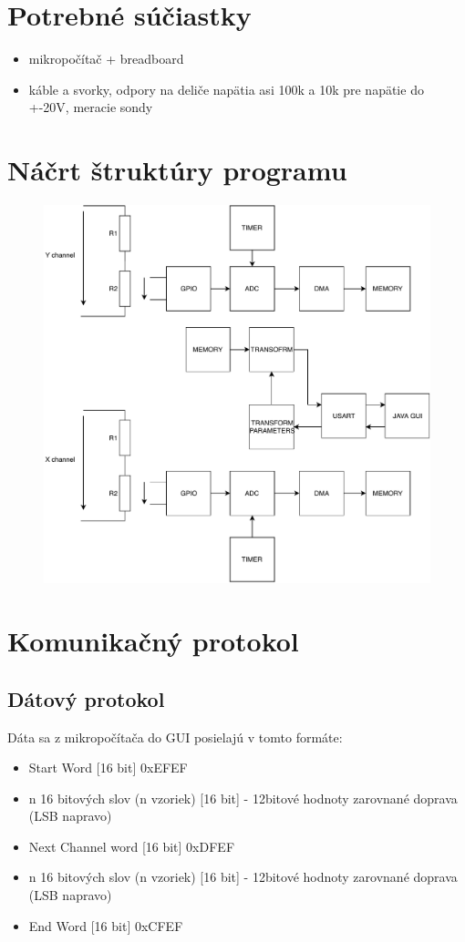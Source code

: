 \documentclass{article}
\begin{document}
	\section{Potrebné súčiastky}
		\begin{itemize}
		\item mikropočítač + breadboard
		\item káble a svorky, odpory na deliče napätia asi 100k a 10k pre napätie do +-20V, meracie sondy
	\end{itemize}
	\section{Náčrt štruktúry programu}
	
	\begin{figure}[h!]
		\centering
		\includegraphics[width=\linewidth]{../Obrazky/basicstructure.pdf}
	\end{figure}


	\pagebreak
	\section{Komunikačný protokol}
	\subsection{Dátový protokol}
	Dáta sa z mikropočítača do GUI posielajú v tomto formáte:
		\begin{itemize}
			\item Start Word [16 bit]	0xEFEF
			\item n 16 bitových slov (n vzoriek) [16 bit] - 12bitové hodnoty zarovnané doprava (LSB napravo)
			\item Next Channel word [16 bit] 0xDFEF
			\item n 16 bitových slov (n vzoriek) [16 bit] - 12bitové hodnoty zarovnané doprava (LSB napravo)
			\item End Word [16 bit] 0xCFEF
		\end{itemize}
		
\end{document}
